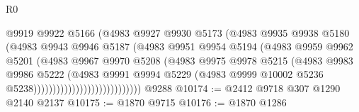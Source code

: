 \begin{lexlean}{R0}
\begin{coremodule}
                                        @9919
                                        @9922
                                        @5166
                                        (@4983
                                          @9927
                                          @9930
                                          @5173
                                          (@4983
                                            @9935
                                            @9938
                                            @5180
                                            (@4983
                                              @9943
                                              @9946
                                              @5187
                                              (@4983
                                                @9951
                                                @9954
                                                @5194
                                                (@4983
                                                  @9959
                                                  @9962
                                                  @5201
                                                  (@4983
                                                    @9967
                                                    @9970
                                                    @5208
                                                    (@4983
                                                      @9975
                                                      @9978
                                                      @5215
                                                      (@4983
                                                        @9983
                                                        @9986
                                                        @5222
                                                        (@4983
                                                          @9991
                                                          @9994
                                                          @5229
                                                          (@4983
                                                            @9999
                                                            @10002
                                                            @5236
                                                            @5238))))))))))))))))))))))))))))
    @9288
@10174 := @2412 @9718 @307 @1290 @2140 @2137
@10175 := @1870 @9715
@10176 := @1870 @1286

\end{coremodule}
\end{lexlean}
